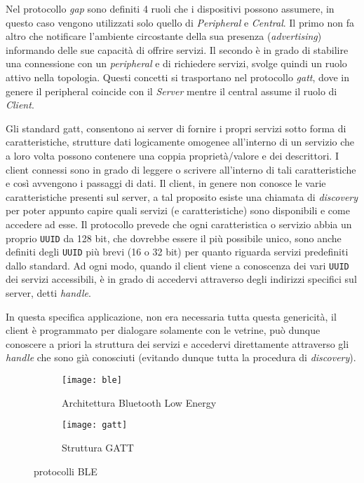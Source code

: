 Nel protocollo \textit{gap} sono definiti 4 ruoli che i dispositivi possono assumere, in questo caso vengono utilizzati solo quello di \textit{Peripheral} e \textit{Central}. Il primo non fa altro che notificare l'ambiente circostante della sua presenza (\textit{advertising}) informando delle sue capacit\`a di offrire servizi. Il secondo \`e in grado di stabilire una connessione con un \textit{peripheral} e di richiedere servizi, svolge quindi un ruolo attivo nella topologia. Questi concetti si trasportano nel protocollo \textit{gatt}, dove in genere il peripheral coincide con il \textit{Server} mentre il central assume il ruolo di \textit{Client}.

Gli standard gatt, consentono ai server di fornire i propri servizi sotto forma di caratteristiche, strutture dati logicamente omogenee all'interno di un servizio che a loro volta possono contenere una coppia propriet\`a/valore e dei descrittori. I client connessi sono in grado di leggere o scrivere all'interno di tali caratteristiche e cos\`i avvengono i passaggi di dati. Il client, in genere non conosce le varie caratteristiche presenti sul server, a tal proposito esiste una chiamata di \textit{discovery} per poter appunto capire quali servizi (e caratteristiche) sono disponibili e come accedere ad esse. Il protocollo prevede che ogni caratteristica o servizio abbia un proprio \texttt{UUID} da 128 bit, che dovrebbe essere il pi\`u possibile unico, sono anche definiti degli \texttt{UUID} pi\`u brevi (16 o 32 bit) per quanto riguarda servizi predefiniti dallo standard. Ad ogni modo, quando il client viene a conoscenza dei vari \texttt{UUID} dei servizi accessibili, \`e in grado di accedervi attraverso degli indirizzi specifici sul server, detti \textit{handle}.

In questa specifica applicazione, non era necessaria tutta questa genericit\`a, il client \`e programmato per dialogare solamente con le vetrine, pu\`o dunque conoscere a priori la struttura dei servizi e accedervi direttamente attraverso gli \textit{handle} che sono gi\`a conosciuti (evitando dunque tutta la procedura di \textit{discovery}).

\begin{figure}[ht]
  \vspace{10pt}
  \center
  \begin{subfigure}{.65\textwidth}
    \texttt{[image: ble]}
    \caption{Architettura Bluetooth Low Energy}
  \end{subfigure}
  \hfill
  \begin{subfigure}{.30\textwidth}
    \texttt{[image: gatt]}
    \caption{Struttura GATT}
  \end{subfigure}
  \caption{protocolli BLE}
\end{figure}

